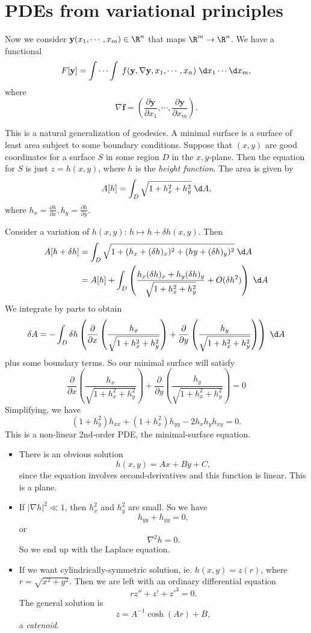\documentclass[a4paper]{article}
\begin{document}
\section{PDEs from variational principles}
Now we consider $\mathbf{y}(x_1, \cdots, x_m) \in \R^n$ that maps $\R^m \to \R^n$. We have a functional
\[
  F[\mathbf{y}] = \int\cdots \int \; f(\mathbf{y}, \nabla \mathbf{y}, x_1, \cdots, x_n)\;\d x_1\cdots \d x_m,
\]
where
\[
  \nabla \mathbf{f} = \left(\frac{\partial \mathbf{y}}{\partial x_1}, \cdots, \frac{\partial \mathbf{y}}{\partial x_m}\right).
\]
\begin{eg}
  This is a natural generalization of geodesics. A minimal surface is a surface of least area subject to some boundary conditions. Suppose that $(x, y)$ are good coordinates for a surface $S$ in some region $D$ in the $x,y$-plane. Then the equation for $S$ is just $z = h(x, y)$, where $h$ is the \emph{height function}. The area is given by
  \[
    A[h] = \int_D \sqrt{1 + h_x^2 + h_y^2}\;\d A,
  \]
  where $h_x = \frac{\partial h}{\partial x}, h_y = \frac{\partial h}{\partial y}$.

  Consider a variation of $h(x, y)$: $h\mapsto h + \delta h(x, y)$. Then
  \begin{align*}
    A[h + \delta h] &= \int_D \sqrt{1 + (h_x + (\delta h)_x)^2 + (hy + (\delta h)_y)^2}\;\d A\\
    &= A[h] + \int_D \left(\frac{h_x (\delta h)_x + h_y (\delta h)_y}{\sqrt{1 + h_x^2 + h_y^2}} + O(\delta h^2)\right)\;\d A
  \end{align*}
  We integrate by parts to obtain
  \[
    \delta A = -\int_D \delta h\left(\frac{\partial}{\partial x} \left(\frac{h_x}{\sqrt{1 + h_x^2 + h_y^2}}\right) + \frac{\partial}{\partial y} \left(\frac{h_y}{\sqrt{1 + h_x^2 + h_y^2}}\right)\right)\;\d A
  \]
  plus some boundary terms. So our minimal surface will satisfy
  \[
    \frac{\partial}{\partial x} \left(\frac{h_x}{\sqrt{1 + h_x^2 + h_y^2}}\right) + \frac{\partial}{\partial y} \left(\frac{h_y}{\sqrt{1 + h_x^2 + h_y^2}}\right) = 0
  \]
  Simplifying, we have
  \[
    (1 + h_y^2)h_{xx} + (1 + h_x^2) h_{yy} - 2h_xh_y h_{xy} = 0.
  \]
  This is a non-linear 2nd-order PDE, the minimal-surface equation.
  \begin{itemize}
    \item There is an obvious solution
      \[
        h(x, y) = Ax + By + C,
      \]
      since the equation involves second-derivatives and this function is linear. This is a plane.

    \item If $|\nabla h|^2 \ll 1$, then $h_x^2$ and $h_y^2$ are small. So we have 
      \[
        h_{yy} + h_{yy} = 0,
      \]
      or
      \[
        \nabla^2 h = 0.
      \]
      So we end up with the Laplace equation.
    \item If we want cylindrically-symmetric solution, ie. $h(x, y) = z(r)$, where $r = \sqrt{x^2 + y^2}$. Then we are left with an ordinary differential equation
      \[
        rz'' + z' + z'^3 = 0.
      \]
      The general solution is
      \[
        z = A^{-1}\cosh (Ar) + B,
      \]
      a \emph{catenoid}.


\end{itemize}
\end{eg}
\end{document}
